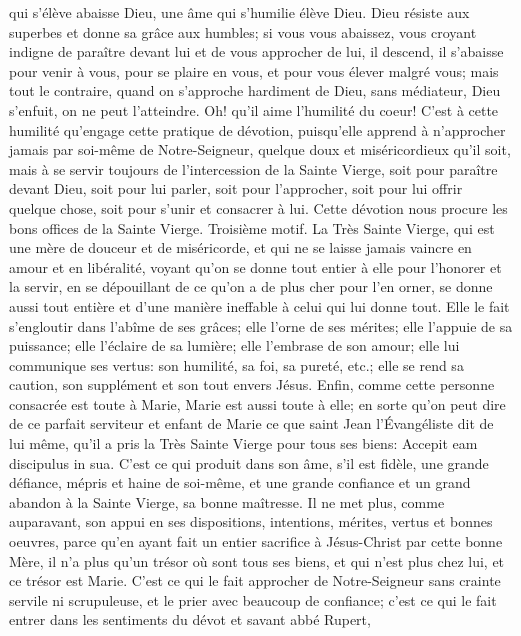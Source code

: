 qui s'élève abaisse Dieu, une âme qui s'humilie élève Dieu. Dieu résiste aux superbes et donne sa grâce aux
humbles; si vous vous abaissez, vous croyant indigne de paraître devant lui et de vous approcher de lui, il
descend, il s'abaisse pour venir à vous, pour se plaire en vous, et pour vous élever malgré vous; mais tout le
contraire, quand on s'approche hardiment de Dieu, sans médiateur, Dieu s'enfuit, on ne peut l'atteindre. Oh! qu'il
aime l'humilité du coeur! C'est à cette humilité qu'engage cette pratique de dévotion, puisqu'elle apprend à
n'approcher jamais par soi-même de Notre-Seigneur, quelque doux et miséricordieux qu'il soit, mais à se servir
toujours de l'intercession de la Sainte Vierge, soit pour paraître devant Dieu, soit pour lui parler, soit pour
l'approcher, soit pour lui offrir quelque chose, soit pour s'unir et consacrer à lui.
Cette dévotion nous procure les bons offices de la Sainte Vierge.
 Troisième motif. La Très Sainte Vierge, qui est une mère de douceur et de miséricorde, et qui ne se laisse
jamais vaincre en amour et en libéralité, voyant qu'on se donne tout entier à elle pour l'honorer et la servir, en se
dépouillant de ce qu'on a de plus cher pour l'en orner, se donne aussi tout entière et d'une manière ineffable à
celui qui lui donne tout. Elle le fait s'engloutir dans l'abîme de ses grâces; elle l'orne de ses mérites; elle l'appuie de
sa puissance; elle l'éclaire de sa lumière; elle l'embrase de son amour; elle lui communique ses vertus: son
humilité, sa foi, sa pureté, etc.; elle se rend sa caution, son supplément et son tout envers Jésus. Enfin, comme
cette personne consacrée est toute à Marie, Marie est aussi toute à elle; en sorte qu'on peut dire de ce parfait
serviteur et enfant de Marie ce que saint Jean l'Évangéliste dit de lui même, qu'il a pris la Très Sainte Vierge pour
tous ses biens: Accepit eam discipulus in sua.
 C'est ce qui produit dans son âme, s'il est fidèle, une grande défiance, mépris et haine de soi-même, et une
grande confiance et un grand abandon à la Sainte Vierge, sa bonne maîtresse. Il ne met plus, comme auparavant,
son appui en ses dispositions, intentions, mérites, vertus et bonnes oeuvres, parce qu'en ayant fait un entier
sacrifice à Jésus-Christ par cette bonne Mère, il n'a plus qu'un trésor où sont tous ses biens, et qui n'est plus chez
lui, et ce trésor est Marie. C'est ce qui le fait approcher de Notre-Seigneur sans crainte servile ni scrupuleuse, et le
prier avec beaucoup de confiance; c'est ce qui le fait entrer dans les sentiments du dévot et savant abbé Rupert,
